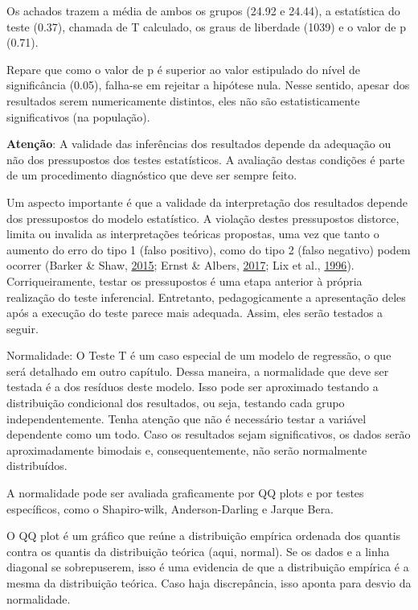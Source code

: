 \documentclass[
]{book}
\begin{document}
Os achados trazem a média de ambos os grupos (24.92 e 24.44), a
estatística do teste (0.37), chamada de T calculado, os graus de
liberdade (1039) e o valor de p (0.71).

Repare que como o valor de p é superior ao valor estipulado do nível de
significância (0.05), falha-se em rejeitar a hipótese nula. Nesse
sentido, apesar dos resultados serem numericamente distintos, eles não
são estatisticamente significativos (na população).

\begin{warning}

\textbf{Atenção}: A validade das inferências dos resultados depende da
adequação ou não dos pressupostos dos testes estatísticos. A avaliação
destas condições é parte de um procedimento diagnóstico que deve ser
sempre feito.

\end{warning}

Um aspecto importante é que a validade da interpretação dos resultados
depende dos pressupostos do modelo estatístico. A violação destes
pressupostos distorce, limita ou invalida as interpretações teóricas
propostas, uma vez que tanto o aumento do erro do tipo 1 (falso
positivo), como do tipo 2 (falso negativo) podem ocorrer (Barker \&
Shaw, \protect\hyperlink{ref-Barker2015}{2015}; Ernst \& Albers,
\protect\hyperlink{ref-Ernst2017}{2017}; Lix et al.,
\protect\hyperlink{ref-Lix1996}{1996}). Corriqueiramente, testar os
pressupostos é uma etapa anterior à própria realização do teste
inferencial. Entretanto, pedagogicamente a apresentação deles após a
execução do teste parece mais adequada. Assim, eles serão testados a
seguir.

Normalidade: O Teste T é um caso especial de um modelo de regressão, o
que será detalhado em outro capítulo. Dessa maneira, a normalidade que
deve ser testada é a dos resíduos deste modelo. Isso pode ser aproximado
testando a distribuição condicional dos resultados, ou seja, testando
cada grupo independentemente. Tenha atenção que não é necessário testar
a variável dependente como um todo. Caso os resultados sejam
significativos, os dados serão aproximadamente bimodais e,
consequentemente, não serão normalmente distribuídos.

A normalidade pode ser avaliada graficamente por QQ plots e por testes
específicos, como o Shapiro-wilk, Anderson-Darling e Jarque Bera.

O QQ plot é um gráfico que reúne a distribuição empírica ordenada dos
quantis contra os quantis da distribuição teórica (aqui, normal). Se os
dados e a linha diagonal se sobrepuserem, isso é uma evidencia de que a
distribuição empírica é a mesma da distribuição teórica. Caso haja
discrepância, isso aponta para desvio da normalidade.
\end{document}
